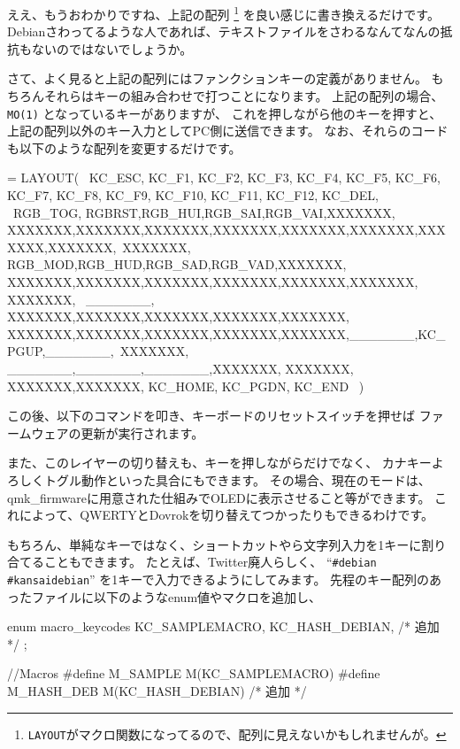 \documentclass[mingoth,a4paper]{jsarticle}
\begin{document}
ええ、もうおわかりですね、上記の配列%
\footnote{\texttt{LAYOUT}がマクロ関数になってるので、配列に見えないかもしれませんが。}
を良い感じに書き換えるだけです。
Debianさわってるような人であれば、テキストファイルをさわるなんてなんの抵抗もないのではないでしょうか。

さて、よく見ると上記の配列にはファンクションキーの定義がありません。
もちろんそれらはキーの組み合わせで打つことになります。
上記の配列の場合、 \verb|MO(1)| となっているキーがありますが、
これを押しながら他のキーを押すと、上記の配列以外のキー入力としてPC側に送信できます。
なお、それらのコードも以下のような配列を変更するだけです。

\begin{commandline}
[1] = LAYOUT( \
KC_ESC, KC_F1, KC_F2,  KC_F3,  KC_F4,  KC_F5,    KC_F6,  KC_F7,  KC_F8,  KC_F9,  KC_F10, KC_F11, KC_F12,  KC_DEL, \
RGB_TOG, RGBRST,RGB_HUI,RGB_SAI,RGB_VAI,XXXXXXX,  XXXXXXX,XXXXXXX,XXXXXXX,XXXXXXX,XXXXXXX,XXXXXXX,XXXXXXX,XXXXXXX,\
XXXXXXX,  RGB_MOD,RGB_HUD,RGB_SAD,RGB_VAD,XXXXXXX, XXXXXXX,XXXXXXX,XXXXXXX,XXXXXXX,XXXXXXX,XXXXXXX,      XXXXXXX, \
_______,   XXXXXXX,XXXXXXX,XXXXXXX,XXXXXXX,XXXXXXX, XXXXXXX,XXXXXXX,XXXXXXX,XXXXXXX,XXXXXXX,_______,KC_PGUP,_______,\
XXXXXXX, _______,_______,_______,XXXXXXX,    XXXXXXX, XXXXXXX,XXXXXXX,                     KC_HOME, KC_PGDN, KC_END \
)
\end{commandline}

この後、以下のコマンドを叩き、キーボードのリセットスイッチを押せば
ファームウェアの更新が実行されます。

\begin{commandline}
\end{commandline}

また、このレイヤーの切り替えも、キーを押しながらだけでなく、
カナキーよろしくトグル動作といった具合にもできます。
その場合、現在のモードは、qmk\_firmwareに用意された仕組みでOLEDに表示させること等ができます。
これによって、QWERTYとDovrokを切り替えてつかったりもできるわけです。

もちろん、単純なキーではなく、ショートカットやら文字列入力を1キーに割り合てることもできます。
たとえば、Twitter廃人らしく、
``\verb|#debian #kansaidebian|'' を1キーで入力できるようにしてみます。
先程のキー配列のあったファイルに以下のようなenum値やマクロを追加し、

\begin{commandline}
enum macro_keycodes {
  KC_SAMPLEMACRO,
  KC_HASH_DEBIAN,  /* 追加 */
};

//Macros
#define M_SAMPLE M(KC_SAMPLEMACRO)
#define M_HASH_DEB M(KC_HASH_DEBIAN)  /* 追加 */
\end{commandline}
\end{document}
